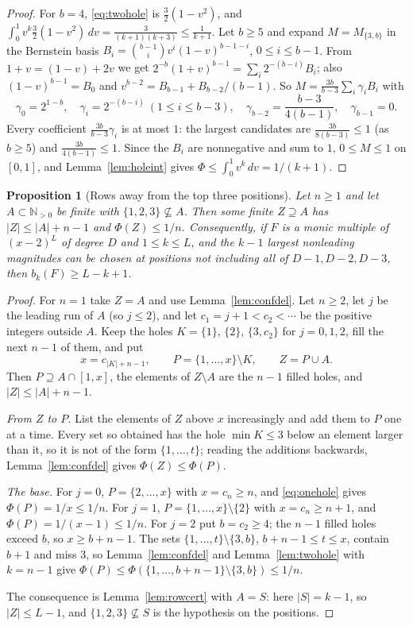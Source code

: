 \documentclass[11pt]{article}
\newtheorem{proposition}[theorem]{Proposition}
\newcommand{\N}{\mathbb N}
\begin{document}
\begin{proof}
For $b=4$, \eqref{eq:twohole} is $\tfrac32(1-v^2)$, and
$\int_0^1v^k\tfrac32(1-v^2)\,dv=\frac3{(k+1)(k+3)}\le\frac1{k+1}$.  Let
$b\ge5$ and expand $M=M_{\{3,b\}}$ in the Bernstein basis
$B_i=\binom{b-1}iv^i(1-v)^{b-1-i}$, $0\le i\le b-1$.  From
$1+v=(1-v)+2v$ we get
$2^{-b}(1+v)^{b-1}=\sum_i2^{-(b-i)}B_i$; also $(1-v)^{b-1}=B_0$ and
$v^{b-2}=B_{b-1}+B_{b-2}/(b-1)$.  So $M=\frac{3b}{b-3}\sum_i\gamma_iB_i$ with
\[
  \gamma_0=2^{1-b},\quad
  \gamma_i=2^{-(b-i)}\ (1\le i\le b-3),\quad
  \gamma_{b-2}=\frac{b-3}{4(b-1)},\quad
  \gamma_{b-1}=0 .
\]
Every coefficient $\frac{3b}{b-3}\gamma_i$ is at most $1$: the largest
candidates are $\frac{3b}{8(b-3)}\le1$ (as $b\ge5$) and $\frac{3b}{4(b-1)}\le1$.
Since the $B_i$ are nonnegative and sum to $1$, $0\le M\le1$ on $[0,1]$, and
Lemma~\ref{lem:holeint} gives
$\Phi\le\int_0^1v^k\,dv=1/(k+1)$.
\end{proof}

\begin{proposition}[Rows away from the top three positions]\label{prop:rowsfree}
Let $n\ge1$ and let $A\subset\N_{>0}$ be finite with
$\{1,2,3\}\not\subseteq A$.  Then some finite $Z\supseteq A$ has
$|Z|\le|A|+n-1$ and $\Phi(Z)\le1/n$.  Consequently, if $F$ is a monic
multiple of $(x-2)^L$ of degree $D$ and $1\le k\le L$, and the $k-1$ largest
nonleading magnitudes can be chosen at positions not including all of
$D-1,D-2,D-3$, then $b_k(F)\ge L-k+1$.
\end{proposition}

\begin{proof}
For $n=1$ take $Z=A$ and use Lemma~\ref{lem:confdel}.  Let $n\ge2$, let $j$
be the leading run of $A$ (so $j\le2$), and let $c_1=j+1<c_2<\cdots$ be the
positive integers outside $A$.  Keep the holes
$K=\{1\}$, $\{2\}$, $\{3,c_2\}$ for $j=0,1,2$, fill the next $n-1$ of them,
and put
\[
  x=c_{|K|+n-1},\qquad P=\{1,\ldots,x\}\setminus K,\qquad Z=P\cup A .
\]
Then $P\supseteq A\cap[1,x]$, the elements of $Z\setminus A$ are the $n-1$
filled holes, and $|Z|\le|A|+n-1$.

\emph{From $Z$ to $P$.}  List the elements of $Z$ above $x$ increasingly and
add them to $P$ one at a time.  Every set so obtained has the hole
$\min K\le3$ below an element larger than it, so it is not of the form
$\{1,\ldots,t\}$; reading the additions backwards, Lemma~\ref{lem:confdel}
gives $\Phi(Z)\le\Phi(P)$.

\emph{The base.}  For $j=0$, $P=\{2,\ldots,x\}$ with $x=c_n\ge n$, and
\eqref{eq:onehole} gives $\Phi(P)=1/x\le1/n$.  For $j=1$,
$P=\{1,\ldots,x\}\setminus\{2\}$ with $x=c_n\ge n+1$, and
$\Phi(P)=1/(x-1)\le1/n$.  For $j=2$ put $b=c_2\ge4$; the $n-1$ filled holes
exceed $b$, so $x\ge b+n-1$.  The sets
$\{1,\ldots,t\}\setminus\{3,b\}$, $b+n-1\le t\le x$, contain $b+1$ and miss
$3$, so Lemma~\ref{lem:confdel} and Lemma~\ref{lem:twohole} with $k=n-1$ give
$\Phi(P)\le\Phi(\{1,\ldots,b+n-1\}\setminus\{3,b\})\le1/n$.

The consequence is Lemma~\ref{lem:rowcert} with $A=S$: here $|S|=k-1$, so
$|Z|\le L-1$, and $\{1,2,3\}\not\subseteq S$ is the hypothesis on the
positions.
\end{proof}
\end{document}
